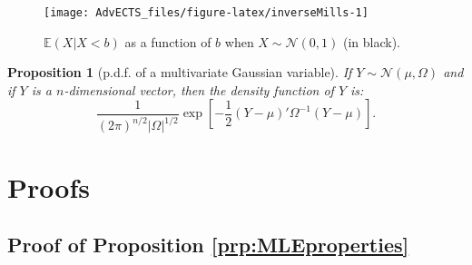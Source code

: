 \documentclass[
]{book}
\newtheorem{proposition}{Proposition}[chapter]
\theoremstyle{definition}
\theoremstyle{definition}
\theoremstyle{definition}
\theoremstyle{definition}
\theoremstyle{remark}
\begin{document}
\begin{figure}

{\centering \texttt{[image: AdvECTS\_files/figure-latex/inverseMills-1]} 

}

\caption{$\mathbb{E}(X|X<b)$ as a function of $b$ when $X\sim \mathcal{N}(0,1)$ (in black).}\label{fig:inverseMills}
\end{figure}

\begin{proposition}[p.d.f. of a multivariate Gaussian variable]
\protect\hypertarget{prp:pdfMultivarGaussian}{}\label{prp:pdfMultivarGaussian}If \(Y \sim \mathcal{N}(\mu,\Omega)\) and if \(Y\) is a \(n\)-dimensional vector, then the density function of \(Y\) is:
\[
\frac{1}{(2 \pi)^{n/2}|\Omega|^{1/2}}\exp\left[-\frac{1}{2}\left(Y-\mu\right)'\Omega^{-1}\left(Y-\mu\right)\right].
\]
\end{proposition}

\hypertarget{proofs}{%
\section{Proofs}\label{proofs}}

\hypertarget{MLEproperties}{%
\subsection{Proof of Proposition \ref{prp:MLEproperties}}\label{MLEproperties}}
\end{document}

